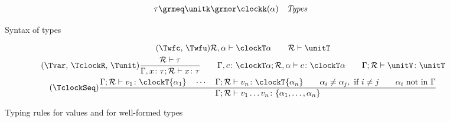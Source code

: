 \begin{figure}[t]
\begin{align*}
      \tau & \grmeq \unitk \grmor \clockk(\alpha)
      & & \textit{Types}
    \end{align*}
 \caption{Syntax of types}
  \label{fig:syn-types}
\end{figure}

 \begin{figure}[t]
 \begin{gather*}
    \tag{\Twfc, \Twfu}
    \mathcal R, \alpha \vdash \clockT \alpha
    \qquad
    \mathcal R \vdash \unitT
\\
\tag{\Tvar, \TclockR, \Tunit}
   \frac{
     \mathcal R \vdash \tau
   }{
     \Gamma,x\colon\tau; \mathcal R
     \vdash x \colon \tau 
   }
   \qquad
\Gamma,c\colon\clockT \alpha; \mathcal R, \alpha
     \vdash c \colon \clockT \alpha \qquad
   \Gamma; \mathcal R
   \vdash \unitV \colon \unitT
   \\
   \tag{\TclockSeq}
   \frac{
     \Gamma; \mathcal R \vdash v_1 \colon \clockT {\alpha_1} 
     \quad
     \cdots
     \quad
     \Gamma; \mathcal R \vdash v_n \colon \clockT {\alpha_n} 
     \qquad 
     \alpha_i \neq \alpha_j, \text{ if } i \neq j 
     \qquad
     \alpha_i \text{ not in } \Gamma
   }{
     \Gamma; \mathcal R \vdash v_1 \dots v_n \colon \{\alpha_1
     , \dots, \alpha_n\}
   }
 \end{gather*}
 \caption{Typing rules for values and for well-formed types}
 \label{fig:typing-values}
\end{figure}

